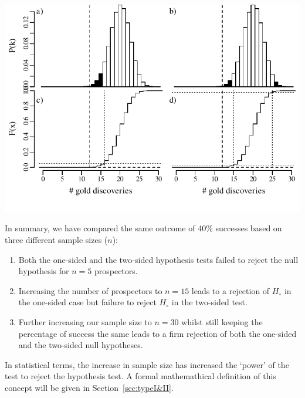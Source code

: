 \noindent\begin{minipage}[t][][b]{.65\textwidth}
  \includegraphics[width=\textwidth]{../figures/binomialrejection30.pdf}
\end{minipage}
\begin{minipage}[t][][t]{.35\textwidth}
  \label{fig:binomialrejection30}
\end{minipage}

In summary, we have compared the same outcome of 40\% successes based
on three different sample sizes ($n$):

\begin{enumerate}
  \item Both the one-sided and the two-sided hypothesis tests failed
    to reject the null hypothesis for $n=5$ prospectors.
  \item Increasing the number of prospectors to $n=15$ leads to a
    rejection of $H_\circ$ in the one-sided case but failure to reject
    $H_\circ$ in the two-sided test.
  \item Further increasing our sample size to $n=30$ whilst still
    keeping the percentage of success the same leads to a firm
    rejection of both the one-sided and the two-sided null hypotheses.
\end{enumerate}

In statistical terms, the increase in sample size has increased the
`power' of the test to reject the hypothesis test. A formal
mathemathical definition of this concept will be given in
Section~\ref{sec:typeI&II}.

